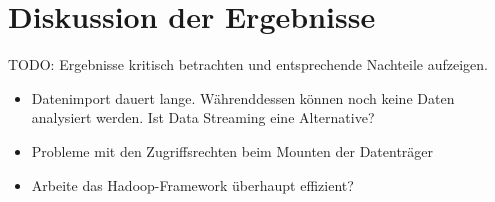\chapter{Diskussion der Ergebnisse}
\label{ch:result_discussion}

TODO: Ergebnisse kritisch betrachten und entsprechende Nachteile aufzeigen.
\begin{itemize}
\item Datenimport dauert lange. Währenddessen können noch keine Daten analysiert werden. Ist Data Streaming eine Alternative?
\item Probleme mit den Zugriffsrechten beim Mounten der Datenträger
\item Arbeite das Hadoop-Framework überhaupt effizient?
\end{itemize}